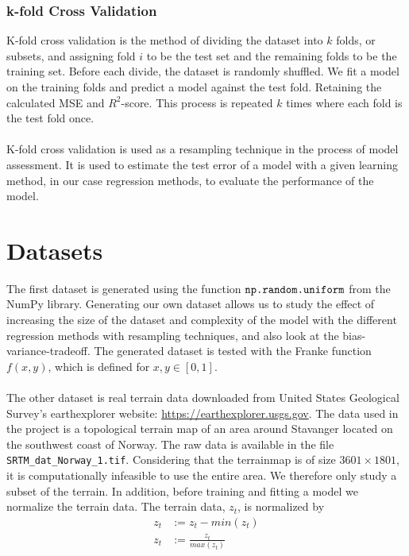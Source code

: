 \documentclass[a4paper,twocolumn]{article}
\begin{document}
\subsubsection{k-fold Cross Validation}
K-fold cross validation is the method of dividing the dataset into $k$ folds, or subsets, and assigning fold $i$ to be the test set and the remaining folds to be the training set. Before each divide, the dataset is randomly shuffled. We fit a model on the training folds and predict a model against the test fold. Retaining the calculated MSE and $R^{2}$-score. This process is repeated $k$ times where each fold is the test fold once.\\
\\
K-fold cross validation is used as a resampling technique in the process of model assessment. It is used to estimate the test error of a model with a given learning method, in our case regression methods, to evaluate the performance of the model.
\section{Datasets}
The first dataset is generated using the function $\verb"np.random.uniform"$ from the NumPy library. Generating our own dataset allows us to study the effect of increasing the size of the dataset and complexity of the model with the different regression methods with resampling techniques, and also look at the bias-variance-tradeoff. The generated dataset is tested with the Franke function $f(x,y)$, which is defined for $x,y \in [0,1]$.\\
\\
The other dataset is real terrain data downloaded from United States Geological Survey's earthexplorer website: \href{https://earthexplorer.usgs.gov}{\color{blue}https://earthexplorer.usgs.gov}. The data used in the project is a topological terrain map of an area around Stavanger located on the southwest coast of Norway. The raw data is available in the file \verb"SRTM_dat_Norway_1.tif". Considering that the terrainmap is of size $3601\times 1801$, it is computationally infeasible to use the entire area. We therefore only study a subset of the terrain. In addition, before training and fitting a model we normalize the terrain data. The terrain data, $z_{t}$, is normalized by
\begin{align*}
    z_{t} &:= z_{t} - min(z_{t})\\
    z_{t} &:= \frac{z_{t}}{max(z_{t})}
\end{align*}
\end{document}
